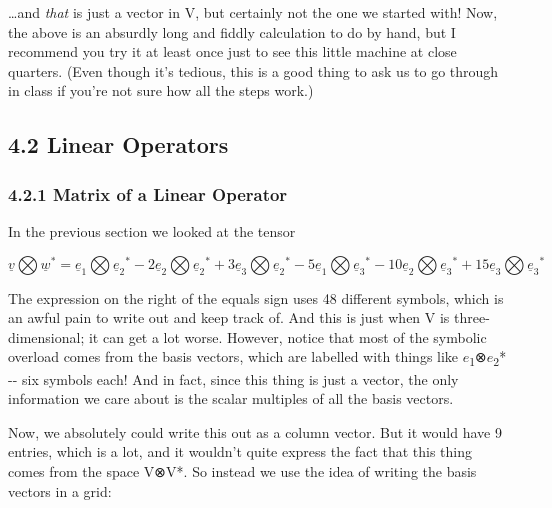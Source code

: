 \documentclass[oneside,english]{amsbook}
\numberwithin{section}{chapter}
\theoremstyle{plain}
\theoremstyle{definition}
\begin{document}
\ldots and \emph{that} is just a vector in V, but certainly not the one
we started with! Now, the above is an absurdly long and fiddly
calculation to do by hand, but I recommend you try it at least once just
to see this little machine at close quarters. (Even though it's tedious,
this is a good thing to ask us to go through in class if you're not sure
how all the steps work.)

\subsection{4.2 Linear Operators}\label{linear-operators-1}

\subsubsection{4.2.1 Matrix of a Linear
	Operator}\label{matrix-of-a-linear-operator}

In the previous section we looked at the tensor

\[\underline{v}\bigotimes{\underline{w}}^{*} = {\underline{e}}_{1}\bigotimes{{\underline{e}}_{2}}^{*} - 2{\underline{e}}_{2}\bigotimes{{\underline{e}}_{2}}^{*} + 3{\underline{e}}_{3}\bigotimes{{\underline{e}}_{2}}^{*} - 5{\underline{e}}_{1}\bigotimes{{\underline{e}}_{3}}^{*} - 10{\underline{e}}_{2}\bigotimes{{\underline{e}}_{3}}^{*} + 15{\underline{e}}_{3}\bigotimes{{\underline{e}}_{3}}^{*}\]

The expression on the right of the equals sign uses 48 different
symbols, which is an awful pain to write out and keep track of. And this
is just when V is three-dimensional; it can get a lot worse. However,
notice that most of the symbolic overload comes from the basis vectors,
which are labelled with things like
$e$\textsubscript{1}⊗$e$\textsubscript{2}* -\/- six symbols each!
And in fact, since this thing is just a vector, the only information we
care about is the scalar multiples of all the basis vectors.

Now, we absolutely could write this out as a column vector. But it would
have 9 entries, which is a lot, and it wouldn't quite express the fact
that this thing comes from the space V⊗V*. So instead we use the idea of
writing the basis vectors in a grid:
\end{document}
